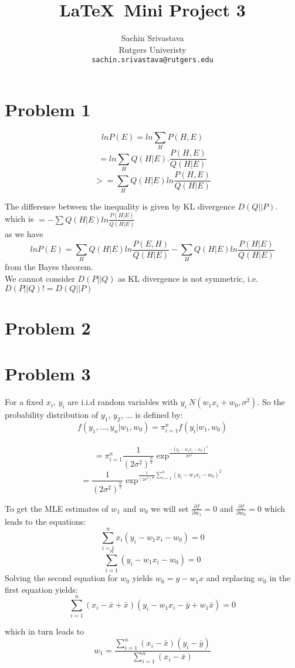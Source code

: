 \documentclass[10pt,onecolumn,letterpaper]{article}
\begin{document}
\title{\LaTeX\ Mini Project 3}

\author{Sachin Srivastava\\
Rutgers Univeristy\\
{\tt\small sachin.srivastava@rutgers.edu}
}


\maketitle


\section{Problem 1}

$$
ln P(E) = ln \sum_{H} P(H,E) 
$$
$$
= ln \sum_{H} Q(H|E). \frac{P(H,E)}{Q(H|E)}
$$
$$
>= \sum_{H} Q(H|E) ln \frac{P(H,E)}{Q(H|E)}
$$

The difference between the inequality is given by KL divergence $D(Q||P)$.
which is $=-\sum Q(H|E) ln \frac{P(H|E)}{Q(H|E)}$\\ as we have\\
$$
ln P(E) = \sum_H Q(H|E) ln\frac{P(E,H)}{Q(H|E)} - \sum_H Q(H|E) ln\frac{ P(H|E)}{Q(H|E)}
$$
from the Bayes theorem.\\

We cannot consider $D(P||Q)$ as KL divergence is not symmetric, i.e. $D(P||Q)!= D(Q||P)$ 
\section{Problem 2}


\section{Problem 3}

For a fixed $x_i$, $y_i$ are i.i.d random variables with $y_i ~ N(w_1x_i +w_0, \sigma^2)$. So the
probability distribution of $y_1$, $y_2$, ... is defined by:\\
$$f(y_1, ..., y_n|w_1,w_0) = \pi_{i=1}^nf(y_i|w_1,w_0)$$\\
$$= \pi_{i=1}^n\frac{1}{(2\sigma^2)^{\frac{n}{2}}} \exp^\frac{-(y_i-w_1x_i-w_0)^2}{2\sigma^2}$$
$$= \frac{1}{(2\sigma^2)^{\frac{n}{2}}} \exp^{\frac{1}{(2\sigma^2)^{\frac{n}{2}}}\sum_{i=1}^n{(y_i-w_1x_i-w_0)^2}}$$

To get the MLE estimates of $w_1$ and $w_0$ we will set $\frac{\partial f}{\partial w_1} = 0$ and $\frac{\partial f}{\partial w_0} = 0$
which leads to the equations:\\
$$
\sum_{i=1}^nx_i(y_i-w_1x_i-w_0)=0
$$
$$
\sum_{i=1}^n(y_i-w_1x_i-w_0)=0
$$
Solving the second equation for $w_0$ yields $w_0 = y - w_1x$ and replacing $w_0$ in the first equation yields:\\
$$
\sum_{i=1}^n(x_i-\bar{x}+\bar{x})(y_i-w_1x_i-\bar{y}+w_1\bar{x})=0
$$

which in turn leads to \\
$$
w_1 = \frac{ \sum_{i=1}^n(x_i-\bar{x})(y_i-\bar{y})}{\sum_{i=1}^n(x_i-\bar{x})}
$$
\end{document}
